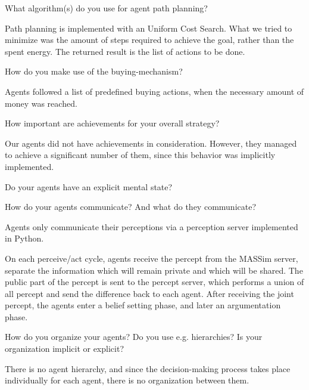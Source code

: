\begin{question}
What algorithm(s) do you use for agent path planning?  
\end{question}

Path planning is
implemented with an Uniform Cost Search. What we tried to minimize was the
amount of steps required to achieve the goal, rather than the spent energy.
The returned result is the list of actions to be done.

\begin{question}
How do you make use of the buying-mechanism?  
\end{question}

Agents followed a list of
predefined buying actions, when the necessary amount of money was reached.

\begin{question}
How important are achievements for your overall strategy?  
\end{question}

Our agents did
not have achievements in consideration. However, they managed to achieve a
significant number of them, since this behavior was implicitly implemented.

\begin{question}
Do your agents have an explicit mental state?
\end{question}


\begin{question}
How do your agents communicate? And what do they communicate?  
\end{question}

Agents only
communicate their perceptions via a perception server implemented in Python.

On each perceive/act cycle, agents receive the percept from the
MASSim server, separate the information which will remain private and which
will be shared.  The public part of the percept is sent to the percept server,
which performs a union of all percept and send the difference back to each
agent. After receiving the joint percept, the agents enter a belief setting
phase, and later an argumentation phase.


\begin{question}
How do you organize your agents? Do you use e.g. hierarchies? Is your
organization implicit or explicit?
\end{question}
There is no agent hierarchy, and since the decision-making process takes
place individually for each agent, there is no organization between them.


